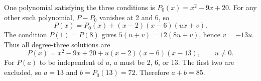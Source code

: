 One polynomial satisfying the three conditions is $P_0(x)=x^2-9x+20$. For any other such polynomial, $P-P_0$ vanishes at 2 and 6, so
\[P(x)=P_0(x)+(x-2)(x-6)(ux+v).\]
The condition $P(1)=P(8)$ gives $5(u+v)=12(8u+v)$, hence $v=-13u$. Thus all degree-three solutions are
\[P(x)=x^2-9x+20+u(x-2)(x-6)(x-13),\qquad u\ne0.\]
For $P(a)$ to be independent of $u$, $a$ must be 2, 6, or 13. The first two are excluded, so $a=13$ and $b=P_0(13)=72$. Therefore $a+b=\boxed{85}$.
